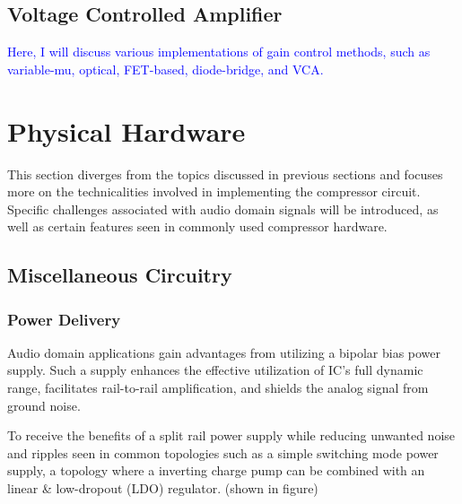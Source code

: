 \documentclass[10pt]{article}
\begin{document}
\begin{multicols*}{2}
            \subsection{Voltage Controlled Amplifier}\label{sect:vca}
                \textcolor{blue}{Here, I will discuss various implementations of gain control methods, such as variable-mu, optical, FET-based, diode-bridge, and VCA.}\cite{analog-comp-types}
                

        \section{Physical Hardware}
            This section diverges from the topics discussed in previous sections and focuses more on the technicalities involved in implementing the compressor circuit. Specific challenges associated with audio domain signals will be introduced, as well as certain features seen in commonly used compressor hardware.

            \subsection{Miscellaneous Circuitry}

                \subsubsection{Power Delivery}
                    Audio domain applications gain advantages from utilizing a bipolar bias power supply. Such a supply enhances the effective utilization of IC's full dynamic range, facilitates rail-to-rail amplification, and shields the analog signal from ground noise. \cite{ti-3-v-rails}\par
                    To receive the benefits of a split rail power supply while reducing unwanted noise and ripples seen in common topologies such as a simple switching mode power supply, a topology where a inverting charge pump can be combined with an linear \& low-dropout (LDO) regulator. (shown in figure)\par
                    
                    \noindent
                    \begin{minipage}{\linewidth}

                        \centering

                        \begin{tikzpicture}[scale = 0.9, transform shape]


\end{tikzpicture}
\end{minipage}
\end{multicols*}
\end{document}
